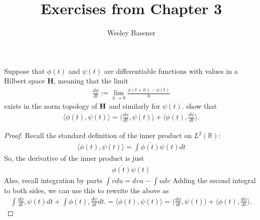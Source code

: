 \documentclass[10pt]{article}
\newenvironment{problem}[2][Problem]{\begin{trivlist}
		\item[\hskip \labelsep {\bfseries #1}\hskip \labelsep {\bfseries #2.}]}{\end{trivlist}}
\begin{document}
	
	\title{Exercises from Chapter 3}
	\author{Wesley Basener}
	\maketitle
	
	\begin{problem}{3.1}
	Suppose that $\phi (t)$ and  $\psi (t)$ are differentiable functions with values in
	a Hilbert space $\mathbf{H}$, meaning that the limit
	\begin{align*}
		\frac{d \phi}{dt} := \lim_{h \to 0} \frac{\phi (t+h) - \phi (t)}{h}
	\end{align*}
	exists in the norm topology of $\bold{H}$ and similarly for $\psi (t)$. show that
	\begin{align*}
		\langle \phi (t), \psi (t) \rangle = \langle \frac{d\phi}{dt}, \psi (t) \rangle + \langle \phi (t), \frac{d \psi}{dt} \rangle.
	\end{align*}
	\end{problem}
	
	\begin{proof}
	Recall the standard definition of the inner product on $L^{2}(\mathbb{R})$:
	\begin{align*}
		\langle \phi (t), \psi (t) \rangle = \int \overline{\phi(t)} \psi(t) dt
	\end{align*}
	So, the derivative of the inner product is just
	\begin{align*}
		\overline{\phi(t)} \psi(t)
	\end{align*}
	Also, recall integration by parts $\int v du = dv u - \int u dv$ Adding the second integral to both sides, we can use this to rewrite the above as
	\begin{align*}
		\int \frac{d\phi}{dt}, \psi (t) dt + \int \phi (t), \frac{d \psi}{dt} dt. 
		= \langle \phi (t), \psi (t) \rangle = \langle \frac{d\phi}{dt}, \psi (t) \rangle + \langle \phi (t), \frac{d \psi}{dt} \rangle. 
	\end{align*}	
    \end{proof}	
    
\end{document}
